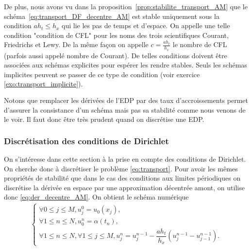 \documentclass[12pt,a4paper,twoside]{article}
\begin{document}
De plus, nous avons vu dans la proposition~\ref{prop:stabilite_transport_AM} que
le sch\'ema~\eqref{eq:transport_DF_decentre_AM} est stable
uniquement sous la condition $a h_t \leq h_x$
qui lie les pas de temps et d'espace.
On appelle une telle condition "condition de CFL" pour 
les noms des trois scientifiques
Courant, Friedrichs et Lewy.
De la m\^eme fa\c{c}on on appelle $c = \frac{a h_t}{h_x}$
le nombre de CFL (parfois aussi appel\'e nombre de Courant).
De telles conditions doivent \^etre associ\'ees aux sch\'emas
explicites pour esp\'erer les rendre stables.
Seuls les sch\'emas implicites peuvent se passer de ce
type de condition (voir exercice \ref{exo:transport_implicite}).


Notons que remplacer les d\'eriv\'ees de l'EDP par des taux d'accroissements permet
d'assurer la consistance d'un sch\'ema mais pas sa stabilit\'e comme nous venons de le voir.
Il faut donc \^etre tr\`es prudent quand on discr\'etise une EDP.


\subsubsection{Discr\'etisation des conditions de Dirichlet}

On s'int\'eresse dans cette section \`a la prise en compte des conditions de Dirichlet.
On cherche donc \`a discr\'etiser le probl\`eme \eqref{eq:transport}.
Pour avoir les m\^emes propri\'et\'es de stabilit\'e que dans le cas des conditions aux limites
p\'eriodiques on discr\'etise la d\'eriv\'ee en espace par une approximation d\'ecentr\'ee
amont, on utilise donc \eqref{eq:der_decentre_AM}.
On obtient le sch\'ema num\'erique
\begin{align}
  \label{eq:transport_DF_decentre_AM_dir}
  \left\{
  \begin{array}{l}
    \forall 0 \leq j \leq M , 
    u_j^0 = u_0(x_j) ,
    \\
    \forall 1 \leq n \leq N, u_0^n = \alpha(t_n) ,
    \\
    \forall 1 \leq n \leq N, \forall 1 \leq j \leq M,
    u_j^n = u_j^{n-1} - \dfrac{a h_t}{h_x} (u_{j}^{n-1} - u_{j-1}^{n-1}) .
  \end{array}
  \right.
\end{align}
\end{document}
